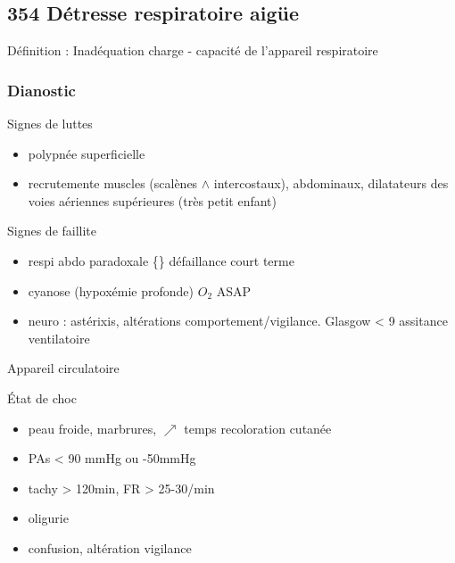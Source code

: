 \documentclass[11pt]{article}
\begin{document}
\subsection{354 \textdagger{} Détresse respiratoire aigüe}
\label{sec:org77d4a95}
\label{org7752461}

Définition : Inadéquation charge - capacité de l'appareil respiratoire

\subsubsection{Dianostic}
\label{sec:orge94485a}
Signes de luttes

\begin{itemize}
\item polypnée superficielle
\item recrutemente muscles (scalènes \(\wedge\) intercostaux), abdominaux,
dilatateurs des voies aériennes supérieures (très petit enfant)
\end{itemize}

Signes de faillite

\begin{itemize}
\item respi abdo paradoxale \{\} défaillance court terme
\item cyanose (hypoxémie profonde) \thus \(O_2\) ASAP
\item neuro : astérixis, altérations comportement/vigilance. Glasgow < 9
\thus assitance ventilatoire
\end{itemize}

Appareil circulatoire


État de choc 

\begin{itemize}
\item peau froide, marbrures, \(\nearrow\) temps recoloration cutanée
\item PAs < 90 mmHg ou -50mmHg
\item tachy > 120min, FR > 25-30/min
\item oligurie
\item confusion, altération vigilance
\end{itemize}
\end{document}
